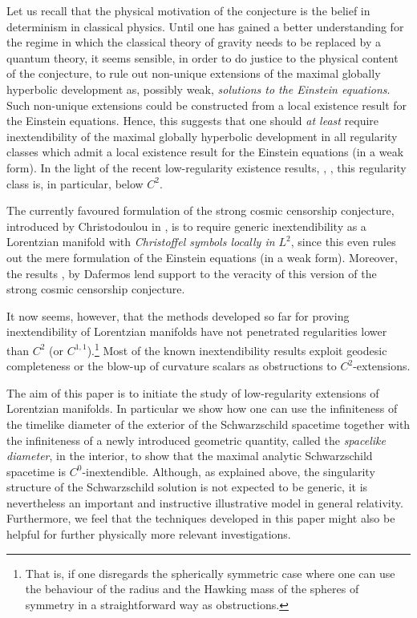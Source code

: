 \documentclass[reqno]{article}
\begin{document}
Let us recall that the physical motivation of the conjecture is the belief in determinism in classical physics. Until one has gained a better understanding for the regime in which the classical theory of gravity needs to be replaced by a quantum theory, it seems sensible, in order to do justice to the physical content of the conjecture, to rule out non-unique extensions of the maximal globally hyperbolic development as, possibly weak, \emph{solutions to the Einstein equations}. Such non-unique extensions could be constructed from a local existence result for the Einstein equations. Hence, this suggests that one should \emph{at least} require inextendibility of the maximal globally hyperbolic development in all regularity classes which admit a local existence result for the Einstein equations (in a weak form). In the light of the recent low-regularity existence results, \cite{KlRodSzef12}, \cite{LukRod12}, this regularity class is, in particular, below $C^2$.   

The currently favoured formulation of the strong cosmic censorship conjecture, introduced by Christodoulou in \cite{Chris09}, is to require generic inextendibility as a Lorentzian manifold with \emph{Christoffel symbols locally in $L^2$}, since this even rules out the mere formulation of the Einstein equations (in a weak form). Moreover, the results \cite{Daf03}, \cite{Daf05a} by Dafermos lend support to the veracity of this version of the strong cosmic censorship conjecture.

It now seems, however, that the methods developed so far for proving inextendibility of Lorentzian manifolds have not penetrated regularities lower than $C^2$ (or $C^{1,1}$).\footnote{That is, if one disregards the spherically symmetric case where one can use the behaviour of the radius and the Hawking mass of the spheres of symmetry in a straightforward way as obstructions.} Most of the known inextendibility results exploit geodesic completeness or the blow-up of curvature scalars as obstructions to $C^2$-extensions. 

The aim of this paper is to initiate the study of low-regularity extensions of Lorentzian manifolds. In particular we show how one can use the infiniteness of the timelike diameter of the exterior of the Schwarzschild spacetime together with the infiniteness of a newly introduced geometric quantity, called the \emph{spacelike diameter}, in the interior, to show that the maximal analytic Schwarzschild spacetime is $C^0$-inextendible. Although, as explained above, the singularity structure of the Schwarzschild solution is not expected to be generic, it is nevertheless an important and instructive illustrative model in general relativity. Furthermore, we feel that the techniques developed in this paper might also be helpful for further physically more relevant investigations.
\end{document}
